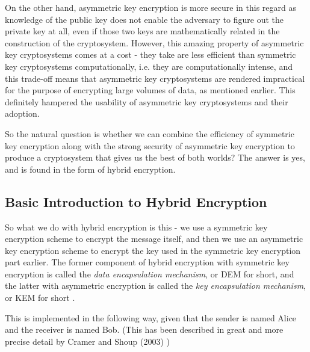 On the other hand, asymmetric key encryption is more secure in this regard as knowledge of the public key does not enable the adversary to figure out the private key at all, even if those two keys are mathematically related in the construction of the cryptosystem.
However, this amazing property of asymmetric key cryptosystems comes at a cost - they take are less efficient than symmetric key cryptosystems computationally, i.e. they are computationally intense, and this trade-off means that asymmetric key cryptosystems are rendered impractical for the purpose of encrypting large volumes of data, as mentioned earlier.
This definitely hampered the usability of asymmetric key cryptosystems and their adoption.

So the natural question is whether we can combine the efficiency of symmetric key encryption along with the strong security of asymmetric key encryption to produce a cryptosystem that gives us the best of both worlds?
The answer is yes, and is found in the form of hybrid encryption.

\subsection{Basic Introduction to Hybrid Encryption}

So what we do with hybrid encryption is this - we use a symmetric key encryption scheme to encrypt the message itself, and then we use an asymmetric key encryption scheme to encrypt the key used in the symmetric key encryption part earlier.
The former component of hybrid encryption with symmetric key encryption is called the \textit{data encapsulation mechanism}, or DEM for short, and the latter with asymmetric encryption is called the \textit{key encapsulation mechanism}, or KEM for short \cite{kuro_he}.

This is implemented in the following way, given that the sender is named Alice and the receiver is named Bob.
(This has been described in great and more precise detail by Cramer and Shoup (2003) \cite{cryptoeprint:2001:108})


